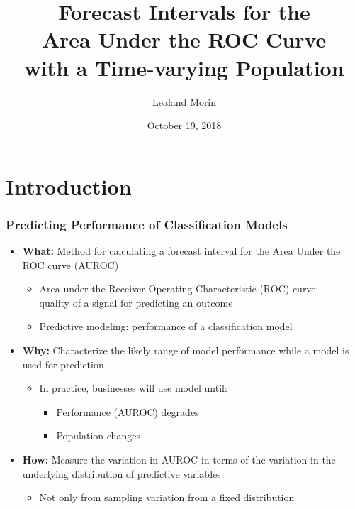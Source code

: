 \documentclass{beamer}
\title[Forecast Intervals for the
    Area Under the ROC Curve]{Forecast Intervals for the \\
    Area Under the ROC Curve \\
    with a Time-varying Population}
\author[Lealand Morin, University of Central Florida]{Lealand Morin}
\institute[University of Central Florida]
{
    Department of Economics \\
    College of Business Administration \\
    University of Central Florida
}
\date{October 19, 2018}
\begin{document}

\frame{\titlepage}

\section[Outline]{}

\frame{\tableofcontents}




\section{Introduction}



\begin{frame}
\frametitle{Predicting Performance of Classification Models}

\begin{itemize}
    \item \textbf{What:} Method for calculating a forecast interval for the Area Under the ROC curve (AUROC)
    \begin{itemize}
        \item Area under the Receiver Operating Characteristic (ROC) curve: \\
        quality of a signal for predicting an outcome
        \item Predictive modeling: performance of a classification model
    \end{itemize}
    \item \textbf{Why:} Characterize the likely range of model performance while a model is used for prediction
    \begin{itemize}
        \item In practice, businesses will use model until:
        \begin{itemize}
            \item Performance (AUROC) degrades
            \item Population changes
        \end{itemize}
    \end{itemize}
    \item \textbf{How:} Measure the variation in AUROC in terms of the variation in the underlying distribution of predictive variables
    \begin{itemize}
        \item Not only from sampling variation from a fixed distribution
    \end{itemize}
\end{itemize}

\end{frame}
\end{document}

